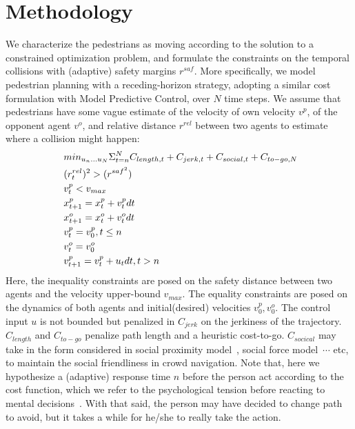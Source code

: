 \documentclass[conference]{IEEEtran}
\begin{document}
\section{Methodology}
\vspace{-0.1em}
We characterize the pedestrians as moving according to the solution to a constrained optimization 
problem, and formulate the constraints on the temporal collisions with 
(adaptive) safety margins $r^{saf}$. More specifically, we model pedestrian 
planning with a receding-horizon strategy, adopting a similar cost formulation with Model 
Predictive Control, over $N$ time steps. We assume that 
pedestrians have some vague estimate of the velocity of 
own velocity $v^p$, of the opponent agent $v^o$, and relative distance 
$r^{rel}$ between 
two agents to estimate where a collision might happen:
\begin{equation}~\label{eq:receding_control}
  \begin{aligned}
    &min_{u_n \dots u_N} \Sigma^N_{t=n} \small{C_{length,t} + C_{jerk,t} + C_{social,t}} + C_{to-go,N}\\
    & (r^{rel}_t)^2 > (r^{{saf}^2})\\
    & v^p_t < v_{max}\\
    & x^p_{t+1} = x^p_t + v^p_t \scriptsize{d}t\\
    & x^o_{t+1} = x^o_t + v^o_t \scriptsize{d}t\\
    & v^p_t = v^p_0, t \leq n\\
    & v^o_t = v^o_0\\
    & v^p_{t+1} = v^p_t + u_t \scriptsize{d}t, t>n
 \end{aligned}
\end{equation}
Here, the inequality constraints are posed on the safety distance between two 
agents and the velocity upper-bound $v_{max}$. The equality constraints are posed on the 
dynamics of both agents and initial(desired) velocities 
$v^p_0, v^o_0$. The control input $u$ is not bounded but 
penalized in $C_{jerk}$ on the jerkiness of the trajectory. 
$C_{length}$ and $C_{to-go}$ penalize path length and a heuristic cost-to-go. 
$C_{socical}$ may take in the form considered in social 
proximity model~\cite{kruse2012legible}, social force 
model~\cite{helbing1995social}$\cdots$ etc, to maintain the social 
friendliness in crowd navigation. Note that, here we hypothesize a (adaptive) response 
time $n$ before the person act according to the cost function, which we refer 
to the psychological tension before reacting to mental 
decisions~\cite{helbing1995}. With that said, the person may have decided to 
change path to avoid, but it takes a while for he/she to really take the action.
\end{document}
